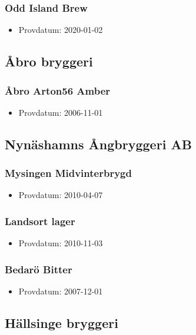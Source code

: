 \documentclass[11pt]{article}
\begin{document}
\subsubsection{Odd Island Brew}
\label{sec:orga8909e4}
\begin{itemize}
\item Provdatum: 2020-01-02
\end{itemize}
\subsection{Åbro bryggeri}
\label{sec:org62f69ba}
\subsubsection{Åbro Arton56 Amber}
\label{sec:org2538be2}
\begin{itemize}
\item Provdatum: 2006-11-01
\end{itemize}
\subsection{Nynäshamns Ångbryggeri AB}
\label{sec:orgf3bb334}
\subsubsection{Mysingen Midvinterbrygd}
\label{sec:org8cff9fb}
\begin{itemize}
\item Provdatum: 2010-04-07
\end{itemize}
\subsubsection{Landsort lager}
\label{sec:org0577e1e}
\begin{itemize}
\item Provdatum: 2010-11-03
\end{itemize}
\subsubsection{Bedarö Bitter}
\label{sec:orgfaa2517}
\begin{itemize}
\item Provdatum: 2007-12-01
\end{itemize}
\subsection{Hällsinge bryggeri}
\label{sec:org7ca583a}
\end{document}
